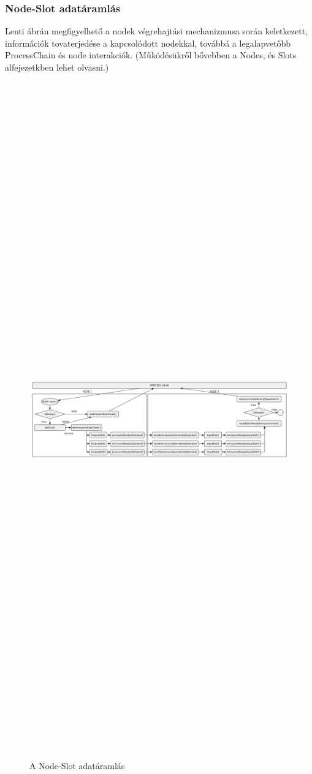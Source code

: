 \documentclass[a4paper,12pt,oneside]{report}
\begin{document}
\begin{landscape}
\subsubsection{Node-Slot adatáramlás}
Lenti ábrán megfigyelhető a nodek végrehajtási mechanizmusa során keletkezett, információk tovaterjedése a kapcsolódott nodekkal, továbbá a legalapvetőbb ProcessChain és node interakciók. (Működésükről bővebben a Nodes, és Slots alfejezetkben lehet olvasni.)
\begin{center}
\begin{figure}[h]
  \includegraphics[width=23cm,height=30cm,keepaspectratio]{node-data.png}
  \caption{A Node-Slot adatáramlás }


\end{figure}
\end{center}
\end{landscape}
\end{document}

